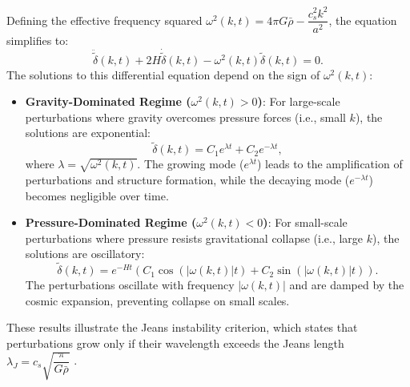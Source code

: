 Defining the effective frequency squared \( \omega^2(k, t) = 4\pi G \bar{\rho} - \dfrac{c_s^2 k^2}{a^2} \), the equation simplifies to:
\begin{equation}
    \ddot{\tilde{\delta}}(k, t) + 2H \dot{\tilde{\delta}}(k, t) - \omega^2(k, t) \tilde{\delta}(k, t) = 0.
\end{equation}
The solutions to this differential equation depend on the sign of \( \omega^2(k, t) \):
\begin{itemize}
    \item \textbf{Gravity-Dominated Regime (\( \omega^2(k, t) > 0 \))}: For large-scale perturbations where gravity overcomes pressure forces (i.e., small \( k \)), the solutions are exponential:
    \begin{equation}
        \label{eq:delta_growing_mode}
        \tilde{\delta}(k, t) = C_1 e^{\lambda t} + C_2 e^{-\lambda t},
    \end{equation}
    where \( \lambda = \sqrt{\omega^2(k, t)} \). The growing mode (\( e^{\lambda t} \)) leads to the amplification of perturbations and structure formation, while the decaying mode (\( e^{-\lambda t} \)) becomes negligible over time.
    \item \textbf{Pressure-Dominated Regime (\( \omega^2(k, t) < 0 \))}: For small-scale perturbations where pressure resists gravitational collapse (i.e., large \( k \)), the solutions are oscillatory:
    \begin{equation}
        \label{eq:delta_oscillatory_mode}
        \tilde{\delta}(k, t) = e^{-Ht} \left( C_1 \cos{\left( |\omega(k, t)| t \right)} + C_2 \sin{\left( |\omega(k, t)| t \right)} \right).
    \end{equation}
    The perturbations oscillate with frequency \( |\omega(k, t)| \) and are damped by the cosmic expansion, preventing collapse on small scales.
\end{itemize}
These results illustrate the Jeans instability criterion, which states that perturbations grow only if their wavelength exceeds the Jeans length \( \lambda_J = c_s \sqrt{\dfrac{\pi}{G \bar{\rho}}} \) \citep{1902RSPTA.199....1J}.

